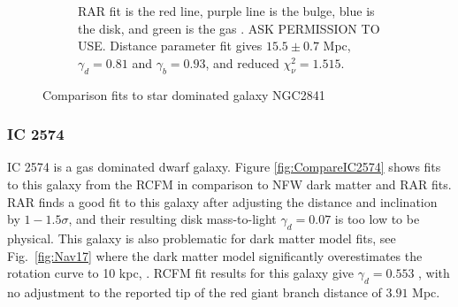 \documentclass[reprint,%
 amsmath,amssymb,
 aps,
]{revtex4-1}
\begin{document}
\begin{figure}[ht]
\begin{subfigure}[b]{0.5\linewidth}
    \caption{RAR fit is the red line, purple line is the bulge, blue is the disk, and green  is the gas \citet{Li_2018}.  ASK PERMISSION TO USE.   Distance parameter fit gives    $15.5\pm 0.7$ Mpc, $\gamma_d =0.81 $ and $\gamma_b =	0.93 $, and reduced $\chi^2_\nu = 1.515$. } 
    \label{fig:2841Li2018Rar} 
    \vspace{4ex}
  \end{subfigure} 
  \caption{Comparison fits to star dominated galaxy NGC2841 }
  \label{fig:CompareNGC2841} 
\end{figure}

\subsubsection{IC 2574}

IC 2574 is  a gas dominated dwarf galaxy.
Figure \ref{fig:CompareIC2574} shows   fits to this galaxy from  the  RCFM in comparison to  NFW dark matter and RAR fits. 
 RAR finds a good fit to this galaxy    after adjusting
the  distance and inclination by $1-1.5 \sigma$, and their resulting disk mass-to-light 
$\gamma_d  = 0.07$ is  too low to be physical. 
This galaxy is also problematic for dark matter model fits, see Fig.~\ref{fig:Nav17} where the dark matter model significantly overestimates  the rotation curve to 10 kpc, \cite{2017MNRAS.471.1841N}.  
RCFM fit results for this galaxy give  $\gamma_d = 0.553$ , with no adjustment to the reported  tip of the red giant branch distance  of  $3.91$ Mpc. 
\end{document}
